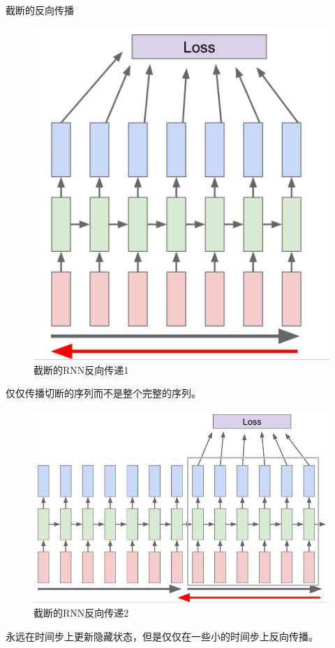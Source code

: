 \documentclass{article}
\begin{document}
截断的反向传播
\begin{figure}[H]
\centering
\includegraphics[scale=0.4]{figure/RNN_TRU1.PNG}
\caption{截断的RNN反向传递1}
\label{fig:9}
\end{figure}
仅仅传播切断的序列而不是整个完整的序列。
\begin{figure}[H]
\centering
\includegraphics[scale=0.4]{figure/RNN_TRU2.PNG}
\caption{截断的RNN反向传递2}
\label{fig:10}
\end{figure}
永远在时间步上更新隐藏状态，但是仅仅在一些小的时间步上反向传播。
\end{document}

